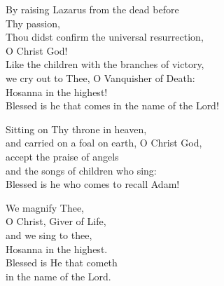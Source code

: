 \documentclass{article}
\begin{document}
%
By raising Lazarus from the dead before \\
        \cont Thy passion, \\
Thou didst confirm the universal resurrection, \\
        \cont O Christ God! \\
Like the children with the branches of victory, \\
we cry out to Thee, O Vanquisher of Death: \\
Hosanna in the highest! \\
Blessed is he that comes in the name
   \cont of the Lord!

Sitting on Thy throne in heaven, \\
and carried on a foal on earth, O Christ God, \\
accept the praise of angels \\
and the songs of children who sing: \\
Blessed is he who comes to recall Adam!

We magnify Thee, \\
O Christ, Giver of Life, \\
and we sing to thee, \\
Hosanna in the highest. \\
Blessed is He that cometh \\
in the name of the Lord.
\end{document}
